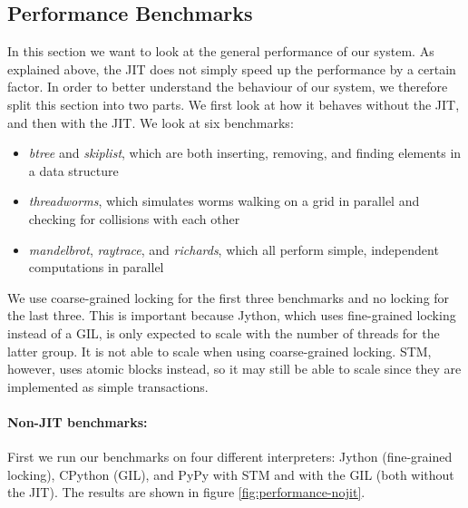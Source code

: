 \documentclass{sigplanconf}
\begin{document}
\subsection{Performance Benchmarks\label{sec:performance-bench}}

In this section we want to look at the general performance of our
system. As explained above, the JIT does not simply speed up the
performance by a certain factor. In order to better understand the
behaviour of our system, we therefore split this section into two
parts. We first look at how it behaves without the JIT, and then with
the JIT. We look at six benchmarks:

\begin{itemize}
\item \emph{btree} and \emph{skiplist}, which are both inserting,
  removing, and finding elements in a data structure
\item \emph{threadworms}, which simulates worms walking on a grid in
  parallel and checking for collisions with each other
\item \emph{mandelbrot}, \emph{raytrace}, and \emph{richards}, which
  all perform simple, independent computations in parallel
\end{itemize}

We use coarse-grained locking for the first three benchmarks and no
locking for the last three. This is important because Jython, which
uses fine-grained locking instead of a GIL, is only expected to scale
with the number of threads for the latter group. It is not able to
scale when using coarse-grained locking. STM, however, uses atomic
blocks instead, so it may still be able to scale since they are
implemented as simple transactions.


\paragraph{Non-JIT benchmarks:} First we run our benchmarks on four
different interpreters: Jython (fine-grained locking), CPython (GIL),
and PyPy with STM and with the GIL (both without the JIT). The results
are shown in figure \ref{fig:performance-nojit}.
\end{document}
